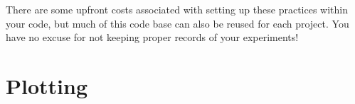 There are some upfront costs associated with setting up these practices within your code, but much of this code base can also be reused for each project. You have no excuse for not keeping proper records of your experiments!

\section{Plotting}




